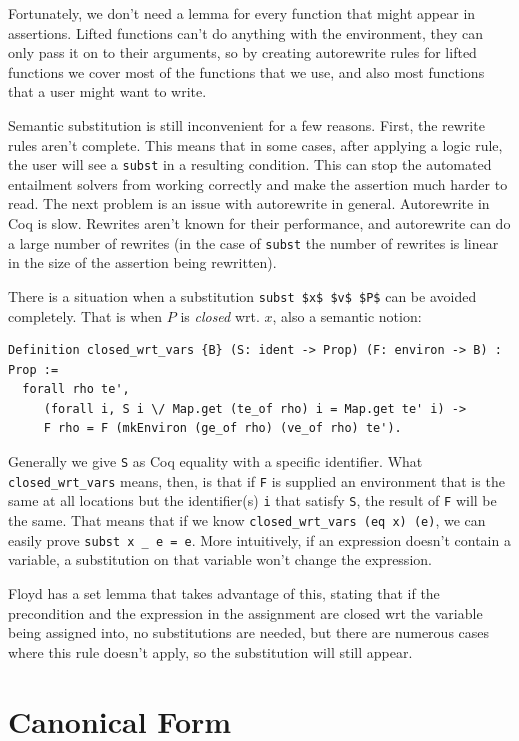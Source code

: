 \documentclass{puthesis}
\begin{document}
Fortunately, we don't need a lemma for every function that might
appear in assertions. Lifted functions can't do anything with the
environment, they can only pass it on to their arguments, so
by creating autorewrite rules for lifted functions we cover
most of the functions that we use, and also most functions
that a user might want to write. 

Semantic substitution is still inconvenient for a few reasons. First,
the rewrite rules aren't complete. This means that in some cases, after
applying a logic rule, the user will see a \lstinline|subst| in a
resulting condition. This can stop the automated entailment
solvers from working correctly and make the assertion much harder
to read. The next problem is an issue with autorewrite in general.
Autorewrite in Coq is slow. Rewrites aren't known for their 
performance, and autorewrite can do a large number of rewrites
(in the case of \lstinline|subst| the number of rewrites is
linear in the size of the assertion being rewritten). 

There is a situation when a substitution \lstinline|subst $x$ $v$ $P$| can
be avoided completely. That is when $P$ is \emph{closed} wrt. 
$x$, also a semantic notion:

\begin{verbatim}
Definition closed_wrt_vars {B} (S: ident -> Prop) (F: environ -> B) : Prop := 
  forall rho te',  
     (forall i, S i \/ Map.get (te_of rho) i = Map.get te' i) ->
     F rho = F (mkEnviron (ge_of rho) (ve_of rho) te').
\end{verbatim}

Generally we give \lstinline|S| as Coq equality with a specific
identifier.  What \lstinline|closed_wrt_vars| means, then, is that if
\lstinline|F| is supplied an environment that is the same at all
locations but the identifier(s) \lstinline|i| that satisfy
\lstinline|S|, the result of \lstinline|F| will be the same. That
means that if we know \lstinline|closed_wrt_vars (eq x) (e)|, we can
easily prove \lstinline|subst x _ e = e|. More intuitively, if an
expression doesn't contain a variable, a substitution on that variable
won't change the expression.

Floyd has a set lemma that takes advantage of this, stating that if
the precondition and the expression in the assignment are closed wrt
the variable being assigned into, no substitutions are needed, but
there are numerous cases where this rule doesn't apply, so the
substitution will still appear.

\section{Canonical Form}
\end{document}
